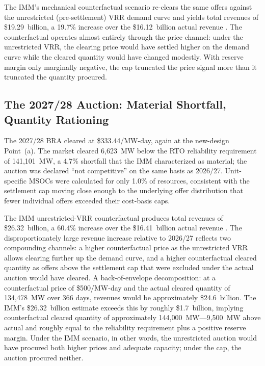 The IMM's mechanical counterfactual scenario re-clears the same offers
against the unrestricted (pre-settlement) VRR demand curve and yields
total revenues of \$19.29~billion, a 19.7\% increase over the
\$16.12~billion actual revenue \citep{MonitoringAnalytics2025_sotm}.
The counterfactual operates almost entirely through the price channel:
under the unrestricted VRR, the clearing price would have settled
higher on the demand curve while the cleared quantity would have changed
modestly. With reserve margin only marginally negative, the cap
truncated the price signal more than it truncated the quantity
procured.

\subsection{The 2027/28 Auction: Material Shortfall, Quantity Rationing}
\label{subsec:case_2027}

The 2027/28 BRA cleared at \$333.44/MW-day, again at the new-design
Point~(a). The market cleared 6{,}623~MW below the RTO reliability
requirement of 141{,}101~MW, a 4.7\% shortfall that the IMM
characterized as material; the auction was declared ``not competitive''
on the same basis as 2026/27. Unit-specific MSOCs were calculated for only
1.0\% of resources, consistent with the settlement cap moving close
enough to the underlying offer distribution that fewer individual
offers exceeded their cost-basis caps.

The IMM unrestricted-VRR counterfactual produces total revenues of
\$26.32~billion, a 60.4\% increase over the \$16.41~billion actual
revenue \citep{MonitoringAnalytics2025_sotm}. The disproportionately
large revenue increase relative to 2026/27 reflects two compounding
channels: a higher counterfactual price as the unrestricted VRR allows
clearing further up the demand curve, and a higher counterfactual
cleared quantity as offers above the settlement cap that were excluded
under the actual auction would have cleared. A back-of-envelope
decomposition: at a counterfactual price of \$500/MW-day and the
actual cleared quantity of 134{,}478~MW over 366 days, revenues would
be approximately \$24.6~billion. The IMM's \$26.32~billion estimate
exceeds this by roughly \$1.7~billion, implying counterfactual cleared
quantity of approximately 144{,}000~MW---9{,}500~MW above actual and
roughly equal to the reliability requirement plus a positive reserve
margin. Under the IMM scenario, in other words, the unrestricted
auction would have procured both higher prices and adequate capacity;
under the cap, the auction procured neither.

